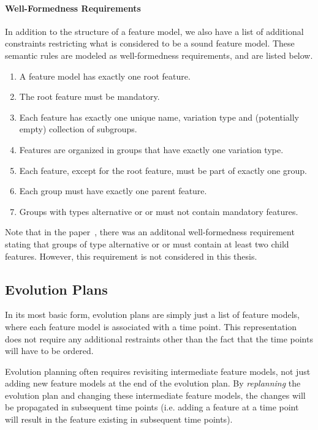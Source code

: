 \documentclass[a4paper,english]{ifimaster}
\begin{document}
\paragraph{Well-Formedness Requirements}%
\label{par:well_formedness_requirements}

In addition to the structure of a feature model, we also have a list of additional constraints restricting what is considered to be a sound feature model. These semantic rules are modeled as well-formedness requirements, and are listed below.

\begin{enumerate}[\textit{\textbf{WF\arabic*}}, itemsep=0mm]
  \item A feature model has exactly one root feature.
  \item The root feature must be mandatory.
  \item Each feature has exactly one unique name, variation type and (potentially empty) collection of subgroups.
  \item Features are organized in groups that have exactly one variation type.
  \item Each feature, except for the root feature, must be part of exactly one group.
  \item Each group must have exactly one parent feature.
  \item Groups with types alternative or or must not contain mandatory features.
\end{enumerate}

Note that in the paper~\cite{cite:consistency_preserving_evolution_planning}, there was an additonal well-formedness requirement stating that groups of type alternative or or must contain at least two child features. However, this requirement is not considered in this thesis.

\subsection{Evolution Plans}%
\label{sub:evolution_plans}

In its most basic form, evolution plans are simply just a list of feature models, where each feature model is associated with a time point. This representation does not require any additional restraints other than the fact that the time points will have to be ordered.

Evolution planning often requires revisiting intermediate feature models, not just adding new feature models at the end of the evolution plan. By \textit{replanning} the evolution plan and changing these intermediate feature models, the changes will be propagated in subsequent time points (i.e. adding a feature at a time point will result in the feature existing in subsequent time points).
\end{document}
